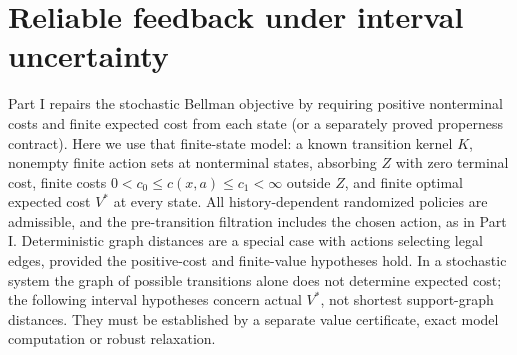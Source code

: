 \documentclass[11pt]{article}
\theoremstyle{definition}\newtheorem{definition}[theorem]{Definition}\newtheorem{example}[theorem]{Example}\newtheorem{conjecture}[theorem]{Conjecture}
\begin{document}
\section{Reliable feedback under interval uncertainty}
Part I repairs the stochastic Bellman objective by requiring positive nonterminal costs and finite expected cost from each state (or a separately proved properness contract). Here we use that finite-state model: a known transition kernel $K$, nonempty finite action sets at nonterminal states, absorbing $Z$ with zero terminal cost, finite costs $0<c_0\le c(x,a)\le c_1<\infty$ outside $Z$, and finite optimal expected cost $V^*$ at every state. All history-dependent randomized policies are admissible, and the pre-transition filtration includes the chosen action, as in Part I. Deterministic graph distances are a special case with actions selecting legal edges, provided the positive-cost and finite-value hypotheses hold. In a stochastic system the graph of possible transitions alone does not determine expected cost; the following interval hypotheses concern actual $V^*$, not shortest support-graph distances. They must be established by a separate value certificate, exact model computation or robust relaxation.
\end{document}
